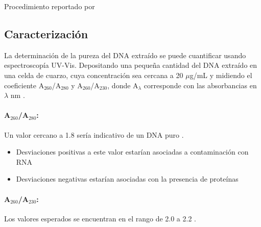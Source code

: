 \documentclass[12pt]{article}
\begin{document}
			\begin{flushright}
				Procedimiento reportado por \citeauthor{puregeneBook}
			\end{flushright}
		
		\subsection{Caracterizaci\'on}
			La determinaci\'on de la pureza del DNA extra\'ido se puede cuantificar usando espectroscop\'ia UV-Vis. Depositando una peque\~na cantidad del DNA extra\'ido en una celda de cuarzo, cuya concentraci\'on sea cercana a 20 $\mu$g/mL y midiendo el coeficiente A$_{260}$/A$_{280}$ y A$_{260}$/A$_{230}$, donde A$_\lambda$ corresponde con las absorbancias en $\lambda$ nm \cite{olson2012dna}.
			\paragraph{A$_{260}$/A$_{280}$:} Un valor cercano a 1.8 ser\'ia indicativo de un DNA puro \cite{wilfinger1997effect, green2012molecular}.
			\begin{itemize}
				\item Desviaciones positivas a este valor estar\'ian asociadas a contaminaci\'on con RNA
				\item Desviaciones negativas estar\'ian asociadas con la presencia de prote\'inas
			\end{itemize}
			\paragraph{A$_{260}$/A$_{230}$:} Los valores esperados se encuentran en el rango de 2.0 a 2.2 \cite{green2012molecular}.
			
\end{document}
